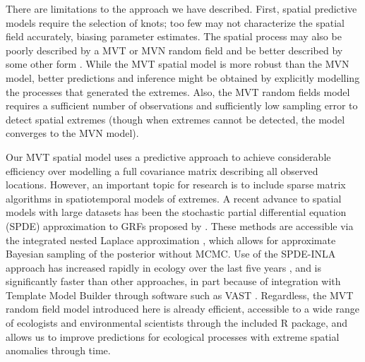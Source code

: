 \documentclass[12pt,english]{article}
\begin{document}
\begin{spacing}{1.9}
There are limitations to the approach we have described. First, spatial
predictive models require the selection of knots; too few may not characterize
the spatial field accurately, biasing parameter estimates. The spatial process
may also be poorly described by a MVT or MVN random field and be better
described by some other form \citep[e.g.\ see][]{conn2015}. While the MVT
spatial model is more robust than the MVN model, better predictions and
inference might be obtained by explicitly modelling the processes that generated
the extremes. Also, the MVT random fields model requires a sufficient number of
observations and sufficiently low sampling error to detect spatial extremes
(though when extremes cannot be detected, the model converges to the MVN model).

Our MVT spatial model uses a predictive approach to achieve considerable
efficiency over modelling a full covariance matrix describing all observed
locations. However, an important topic for research is to include sparse matrix
algorithms in spatiotemporal models of extremes. A recent advance to spatial
models with large datasets has been the stochastic partial differential equation
(SPDE) approximation to GRFs proposed by \citet{lindgren2011}. These methods are
accessible via the integrated nested Laplace approximation
\citep[INLA,][]{rue2009}, which allows for approximate Bayesian sampling of the
posterior without MCMC. Use of the SPDE-INLA approach has increased rapidly in
ecology over the last five years \citep[e.g.][]{illian2013, ono2016}, and is
significantly faster than other approaches, in part because of integration with
Template Model Builder through software such as VAST \citep{thorson2017}.
Regardless, the MVT random field model introduced here is already efficient,
accessible to a wide range of ecologists and environmental scientists through
the included R package, and allows us to improve predictions for ecological
processes with extreme spatial anomalies through time.





\end{spacing}
\end{document}
